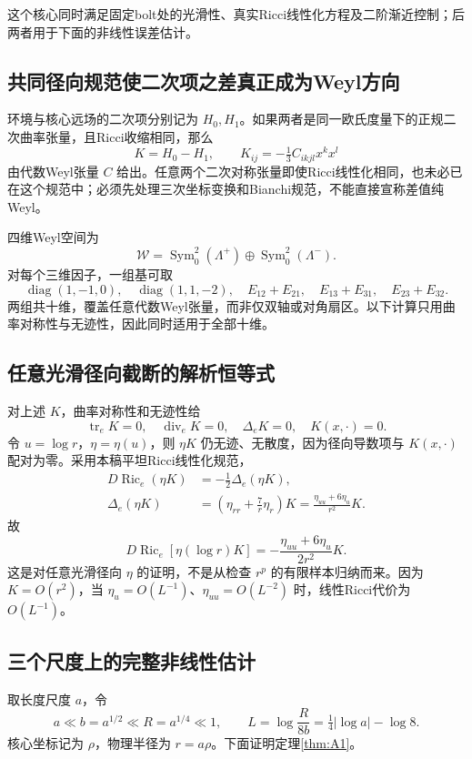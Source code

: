 \documentclass[UTF8,a4paper,11pt,fontset=fandol]{ctexart}
\numberwithin{equation}{section}
\theoremstyle{definition}
\newcommand{\Ric}{\operatorname{Ric}}
\newcommand{\tr}{\operatorname{tr}}
\begin{document}
这个核心同时满足固定bolt处的光滑性、真实Ricci线性化方程及二阶渐近控制；后两者用于下面的非线性误差估计。

\subsection{共同径向规范使二次项之差真正成为Weyl方向}
环境与核心远场的二次项分别记为 $H_0,H_1$。如果两者是同一欧氏度量下的正规二次曲率张量，且Ricci收缩相同，那么
\[
K=H_0-H_1,\qquad
K_{ij}=-\tfrac13 C_{ikjl}x^kx^l
\]
由代数Weyl张量 $C$ 给出。任意两个二次对称张量即使Ricci线性化相同，也未必已在这个规范中；必须先处理三次坐标变换和Bianchi规范，不能直接宣称差值纯Weyl。

四维Weyl空间为
\[
\mathcal W=\operatorname{Sym}^2_0(\Lambda^+)\oplus
\operatorname{Sym}^2_0(\Lambda^-).
\]
对每个三维因子，一组基可取
\[
\operatorname{diag}(1,-1,0),\quad
\operatorname{diag}(1,1,-2),\quad
E_{12}+E_{21},\quad E_{13}+E_{31},\quad E_{23}+E_{32}.
\]
两组共十维，覆盖任意代数Weyl张量，而非仅双轴或对角扇区。以下计算只用曲率对称性与无迹性，因此同时适用于全部十维。

\subsection{任意光滑径向截断的解析恒等式}
对上述 $K$，曲率对称性和无迹性给
\[
\tr_eK=0,\quad \operatorname{div}_eK=0,\quad
\Delta_eK=0,\quad K(x,\cdot)=0.
\]
令 $u=\log r$，$\eta=\eta(u)$，则 $\eta K$ 仍无迹、无散度，因为径向导数项与 $K(x,\cdot)$ 配对为零。采用本稿平坦Ricci线性化规范，
\begin{align}
D\Ric_e(\eta K)&=-\tfrac12\Delta_e(\eta K),\\
\Delta_e(\eta K)&=\left(\eta_{rr}+\frac7r\eta_r\right)K
=\frac{\eta_{uu}+6\eta_u}{r^2}K.
\end{align}
故
\begin{equation}\label{eq:logidentity}
\boxed{D\Ric_e[\eta(\log r)K]=-
\frac{\eta_{uu}+6\eta_u}{2r^2}K.}
\end{equation}
这是对任意光滑径向 $\eta$ 的证明，不是从检查 $r^p$ 的有限样本归纳而来。因为 $K=O(r^2)$，当 $\eta_u=O(L^{-1})$、$\eta_{uu}=O(L^{-2})$ 时，线性Ricci代价为 $O(L^{-1})$。

\subsection{三个尺度上的完整非线性估计}
取长度尺度 $a$，令
\begin{equation}
a\ll b=a^{1/2}\ll R=a^{1/4}\ll1,\qquad
L=\log\frac{R}{8b}=\tfrac14|\log a|-\log8.
\end{equation}
核心坐标记为 $\rho$，物理半径为 $r=a\rho$。下面证明定理\ref{thm:A1}。
\end{document}
